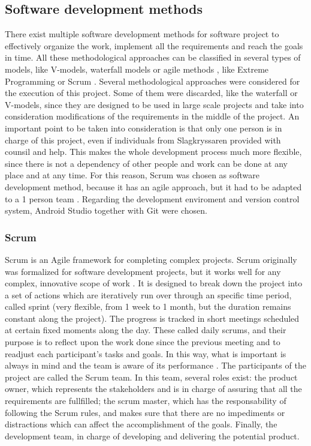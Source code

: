 \subsection{Software development methods}
There exist multiple software development methods for software project to effectively organize the work, implement all the requirements and reach the goals in time. All these methodological approaches can be classified in several types of models, like V-models, waterfall models or agile methods \cite{mccormick2012}, like Extreme Programming \cite{beck2000extreme} or Scrum \cite{schwaber2002agile}. Several methodological approaches were considered for the execution of this project. Some of them were discarded, like the waterfall or V-models, since they are designed to be used in large scale projects and take into consideration modifications of the requirements in the middle of the project. An important point to be taken into consideration is that only one person is in charge of this project, even if individuals from Slagkryssaren provided with counsil and help. This makes the whole development process much more flexible, since there is not a dependency of other people and work can be done at any place and at any time. For this reason, Scrum was chosen as software development method, because it has an agile approach, but it had to be adapted to a 1 person team \cite{schwaber2002agile}. Regarding the development enviroment and version control system, Android Studio together with Git were chosen.

\subsubsection{Scrum}
Scrum is an Agile framework for completing complex projects. Scrum originally was formalized for software development projects, but it works well for any complex, innovative scope of work \cite{alliance2016learn}. It is designed to break down the project into a set of actions which are iteratively run over through an specific time period, called sprint (very flexible, from 1 week to 1 month, but the duration remains constant along the project). The progress is tracked in short meetings scheduled at certain fixed moments along the day. These called daily scrums, and their purpose is to reflect upon the work done since the previous meeting and to readjust each participant's tasks and goals. In this way, what is important is always in mind and the team is aware of its performance \cite{rising2000scrum}. The participants of the project are called the Scrum team. In this team, several roles exist: the product owner, which represents the stakeholders and is in charge of assuring that all the requirements are fullfilled; the scrum master, which has the responsability of following the Scrum rules, and makes sure that there are no impediments or distractions which can affect the accomplishment of the goals. Finally, the development team, in charge of developing and delivering the potential product.

